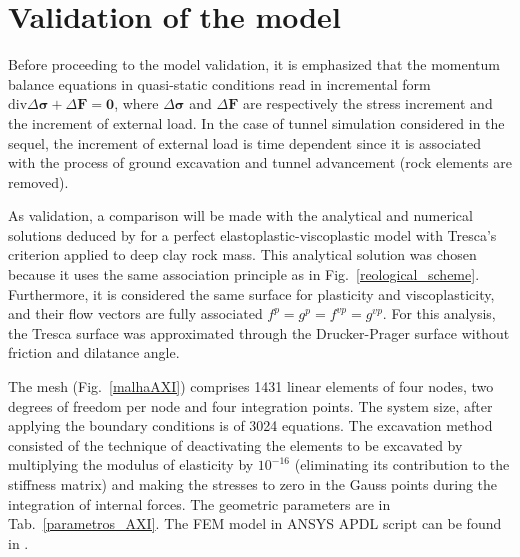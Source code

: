 \documentclass[Journal,letterpaper]{ascelike-new}
\newcommand{\Fl}{\boldsymbol{F}}
\newcommand{\stress}{\boldsymbol{\sigma}}
\newcommand{\zerol}{\boldsymbol 0}
\begin{document}
\section{Validation of the model}

Before proceeding to the model validation, it is emphasized that the momentum balance equations in quasi-static conditions read in incremental form $\text{div}\Delta \stress + \Delta \Fl = \zerol$, where $\Delta \stress$ and $\Delta \Fl$ are respectively the stress increment and the increment of external load. In the case of tunnel simulation considered in the sequel, the increment of external load is time dependent since it is associated with the process of ground excavation and tunnel advancement (rock elements are removed).

As validation, a comparison will be made with the analytical and numerical solutions deduced by \cite{piepi1995} for a perfect elastoplastic-viscoplastic model with Tresca’s criterion applied to deep clay rock mass. This analytical solution was chosen because it uses the same association principle as in Fig.~\ref{reological_scheme}. Furthermore, it is considered the same surface for plasticity and viscoplasticity, and their flow vectors are fully associated  $f^p = g^{p} = f^{vp} = g^{vp}$. For this analysis, the Tresca surface was approximated through the Drucker-Prager surface without friction and dilatance angle.

The mesh (Fig.~\ref{malhaAXI}) comprises 1431 linear elements of four nodes, two degrees of freedom per node and four integration points. The system size, after applying the boundary conditions is of 3024 equations. The excavation method consisted of the technique of deactivating the elements to be excavated by multiplying the modulus of elasticity by $10^{-16}$ (eliminating its contribution to the stiffness matrix) and making the stresses to zero in the Gauss points during the integration of internal forces. The geometric parameters are in Tab.~\ref{parametros_AXI}. The FEM model in ANSYS APDL script can be found in .
\end{document}

